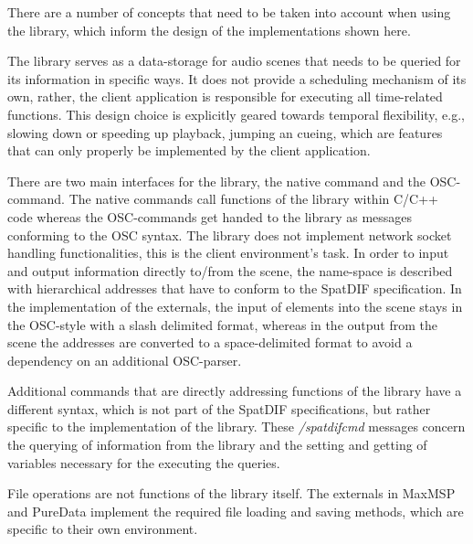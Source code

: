 \documentclass{article}
\begin{document}
There are a number of concepts that need to be taken into account when using the library, which inform the design of the implementations shown here.

The library serves as a data-storage for audio scenes that needs to be queried for its information in specific ways.
It does not provide a scheduling mechanism of its own, rather, the client application is responsible for executing all time-related functions.
This design choice is explicitly geared towards temporal flexibility, e.g., slowing down or speeding up playback, jumping an cueing, which are features that can only properly be implemented by the client application.

There are two main interfaces for the library, the native command and the OSC-command.
The native commands call functions of the library within C/C++ code whereas the OSC-commands get handed to the library as messages conforming to the OSC syntax.
The library does not implement network socket handling functionalities, this is the client environment's task.
In order to input and output information directly to/from the scene, the name-space is described with hierarchical addresses that have to conform to the SpatDIF specification.
In the implementation of the externals, the input of elements into the scene stays in the OSC-style with a slash delimited format, whereas in the output from the scene the addresses are converted to a space-delimited format to avoid a dependency on an additional OSC-parser.

Additional commands that are directly addressing functions of the library have a different syntax, which is not part of the SpatDIF specifications, but rather specific to the implementation of the library.
These \emph{/spatdifcmd} messages concern the querying of information from the library and the setting and getting of variables necessary for the executing the queries.

File operations are not functions of the library itself.
The externals in MaxMSP and PureData implement the required file loading and saving methods, which are specific to their own environment. 
 
\end{document}
